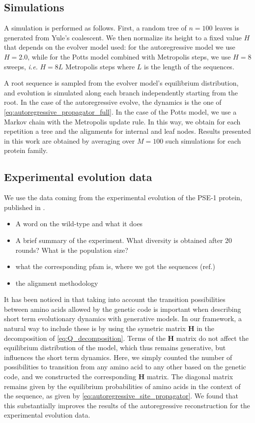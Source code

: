 \subsection{Simulations}

A simulation is performed as follows. 
First, a random tree of $n=100$ leaves is generated from Yule's coalescent. 
We then normalize its height to a fixed value $H$ that depends on the evolver model used: for the autoregressive model we use $H=2.0$, while for the Potts model combined with Metropolis steps, we use $H=8$ sweeps, \emph{i.e.} $H=8 L$ Metropolis steps where $L$ is the length of the sequences. 

A root sequence is sampled from the evolver model's equilibrium distribution, and evolution is simulated along each branch independently starting from the root. 
In the case of the autoregressive evolve, the dynamics is the one of \eqref{eq:autoregressive_propagator_full}. 
In the case of the Potts model, we use a Markov chain with the Metropolis update rule. 
In this way, we obtain for each repetition a tree and the alignments for internal and leaf nodes. 
Results presented in this work are obtained by averaging over $M=100$ such simulations for each protein family. 

\subsection{Experimental evolution data}

We use the data coming from the experimental evolution of the PSE-1 protein, published in \cite{stiffler_proteinstructureexperimental_2020}. 

\begin{itemize}
	\item A word on the wild-type and what it does
	\item A brief summary of the experiment. What diversity is obtained after 20 rounds? What is the population size?
	\item what the corresponding pfam is, where we got the sequences (ref.)
	\item the alignment methodology
\end{itemize}

It has been noticed in \cite{bisardi_modelingsequencespaceexploration_2021} that taking into account the transition possibilities between amino acids allowed by the genetic code is important when describing short term evolutionary dynamics with generative models. 
In our framework, a natural way to include these is by using the symetric matrix $\mathbf{H}$ in the decomposition of \eqref{eq:Q_decomposition}. 
Terms of the $\mathbf{H}$ matrix do not affect the equilibrium distribution of the model, which thus remains generative, but influences the short term dynamics. 
Here, we simply counted the number of possibilities to transition from any amino acid to any other based on the genetic code, and we constructed the corresponding $\mathbf{H}$ matrix. 
The diagonal matrix remains given by the equilibrium probabilities of amino acids in the context of the sequence, as given by \eqref{eq:autoregressive_site_propagator}.
We found that this substantially improves the results of the autoregressive reconstruction for the experimental evolution data.

